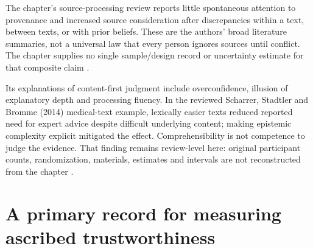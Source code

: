 The chapter's source-processing review reports little spontaneous attention
to provenance and increased source consideration after discrepancies
within a text, between texts, or with prior beliefs. These are the
authors' broad literature summaries, not a universal law that every
person ignores sources until conflict. The chapter supplies no single
sample/design record or uncertainty estimate for that composite claim
\cite[p.~770]{BrommeGierth2021PublicScience}.

Its explanations of content-first judgment include overconfidence,
illusion of explanatory depth and processing fluency. In the reviewed
Scharrer, Stadtler and Bromme (2014) medical-text example, lexically easier
texts reduced reported need for expert advice despite difficult underlying
content; making epistemic complexity explicit mitigated the effect.
Comprehensibility is not competence to judge the evidence. That finding
remains review-level here: original participant counts, randomization,
materials, estimates and intervals are not reconstructed from the chapter
\cite[p.~771]{BrommeGierth2021PublicScience}.

\section{A primary record for measuring ascribed trustworthiness}
\label{sec:p18-r143-meti}

